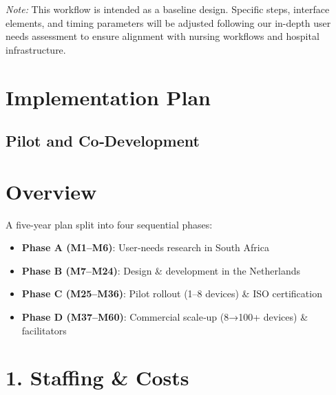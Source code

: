 \documentclass[a4paper,11pt]{article}
\begin{document}
\noindent\textit{Note:} This workflow is intended as a baseline design.  Specific steps, interface elements, and timing parameters will be adjusted following our in-depth user needs assessment to ensure alignment with nursing workflows and hospital infrastructure.  



\section{Implementation Plan}
\subsection{Pilot and Co‐Development}

\section*{Overview}
A five-year plan split into four sequential phases:
\begin{itemize}
  \item \textbf{Phase A (M1–M6)}: User‐needs research in South Africa
  \item \textbf{Phase B (M7–M24)}: Design \& development in the Netherlands
  \item \textbf{Phase C (M25–M36)}: Pilot rollout (1–8 devices) \& ISO certification
  \item \textbf{Phase D (M37–M60)}: Commercial scale‐up (8→100+ devices) \& facilitators
\end{itemize}

\section*{1. Staffing \& Costs}
\end{document}
